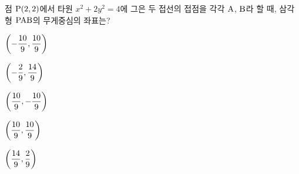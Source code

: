점 $\mathrm{P}(2{,}\mkern3mu\mathopen{}2)$에서 타원 $x^2+2y^2=4$에 그은 두 접선의 접점을 각각 $\mathrm{A}$, $\mathrm{B}$라 할 때, 삼각형 $\mathrm{PAB}$의 무게중심의 좌표는?
\begin{choices32}{\rule[-3ex]{0pt}{8ex}$\left(-\dfrac{10}{9}{,}\mkern3mu\mathopen{}\dfrac{10}{9}\right)$}{\rule[-3ex]{0pt}{8ex}$\left(-\dfrac{2}{9}{,}\mkern3mu\mathopen{}\dfrac{14}{9}\right)$}{\rule[-3ex]{0pt}{8ex}$\left(\dfrac{10}{9}{,}\mkern3mu\mathopen{}-\dfrac{10}{9}\right)$}{\rule[-3ex]{0pt}{8ex}$\left(\dfrac{10}{9}{,}\mkern3mu\mathopen{}\dfrac{10}{9}\right)$}{\rule[-3ex]{0pt}{8ex}$\left(\dfrac{14}{9}{,}\mkern3mu\mathopen{}\dfrac{2}{9}\right)$}\end{choices32}
